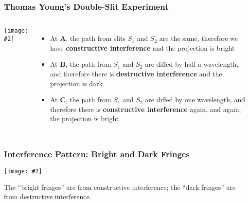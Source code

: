 \documentclass[compress,aspectratio=169]{beamer}
\newcommand{\pic}[2]{\texttt{[image: \#2]}}
\begin{document}
\begin{frame}
  \frametitle{Thomas Young's Double-Slit Experiment}
  \begin{columns}
    \pic{1}{graphics/path1.png}
    \begin{itemize}
    \item At \textbf{A}, the path from slits $S_1$ and $S_2$ are the same,
      therefore we have \textbf{constructive interference} and the projection
      is bright
    \item At \textbf{B}, the path from $S_1$ and $S_2$ are diffed by half a
      wavelength, and therefore there is \textbf{destructive interference} and
      the projection is dark
    \item At \textbf{C}, the path from $S_1$ and $S_2$ are diffed by one
      wavelength, and therefore there is \textbf{constructive interference}
      again, and again, the projection is bright
    \end{itemize}
  \end{columns}
\end{frame}

\begin{frame}
  \frametitle{Interference Pattern: Bright and Dark Fringes}
  \begin{center}
    \pic{.4}{graphics/fringes1.png}
  \end{center}
  The ``bright fringes'' are from constructive interference; the ``dark
  fringes'' are from destructive interference.
\end{frame}
\end{document}
